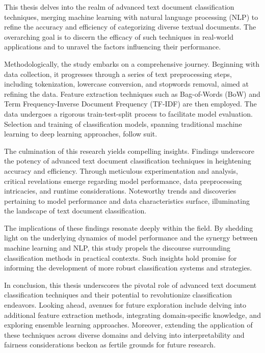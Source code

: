 
This thesis delves into the realm of advanced text document classification techniques, merging machine learning with natural language processing (NLP) to refine the accuracy and efficiency of categorizing diverse textual documents. The overarching goal is to discern the efficacy of such techniques in real-world applications and to unravel the factors influencing their performance.

Methodologically, the study embarks on a comprehensive journey. Beginning with data collection, it progresses through a series of text preprocessing steps, including tokenization, lowercase conversion, and stopwords removal, aimed at refining the data. Feature extraction techniques such as Bag-of-Words (BoW) and Term Frequency-Inverse Document Frequency (TF-IDF) are then employed. The data undergoes a rigorous train-test-split process to facilitate model evaluation. Selection and training of classification models, spanning traditional machine learning to deep learning approaches, follow suit.

The culmination of this research yields compelling insights. Findings underscore the potency of advanced text document classification techniques in heightening accuracy and efficiency. Through meticulous experimentation and analysis, critical revelations emerge regarding model performance, data preprocessing intricacies, and runtime considerations. Noteworthy trends and discoveries pertaining to model performance and data characteristics surface, illuminating the landscape of text document classification.

The implications of these findings resonate deeply within the field. By shedding light on the underlying dynamics of model performance and the synergy between machine learning and NLP, this study propels the discourse surrounding classification methods in practical contexts. Such insights hold promise for informing the development of more robust classification systems and strategies.

In conclusion, this thesis underscores the pivotal role of advanced text document classification techniques and their potential to revolutionize classification endeavors. Looking ahead, avenues for future exploration include delving into additional feature extraction methods, integrating domain-specific knowledge, and exploring ensemble learning approaches. Moreover, extending the application of these techniques across diverse domains and delving into interpretability and fairness considerations beckon as fertile grounds for future research.
